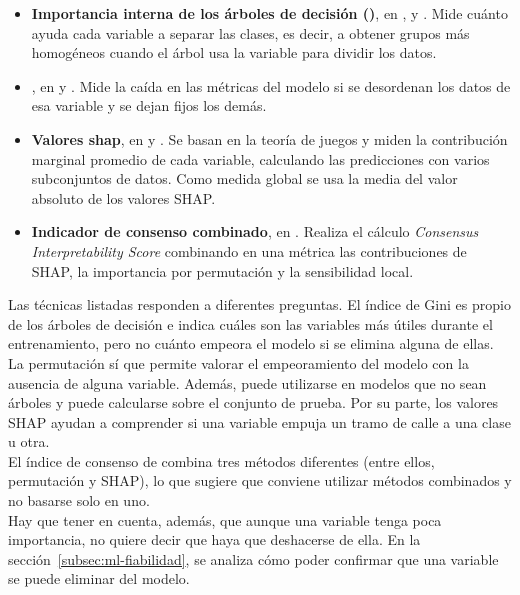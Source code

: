 \begin{itemize}
  \item \textbf{Importancia interna de los árboles de decisión ()}, en \textcite{smith2013}, \textcite{dong2019} y \textcite{li2024gsv}. Mide cuánto ayuda cada variable a separar las clases, es decir, a obtener grupos más homogéneos cuando el árbol usa la variable para dividir los datos.
  \item \textbf{}, en \textcite{agal2026} y \textcite{wu2026}. Mide la caída en las métricas del modelo si se desordenan los datos de esa variable y se dejan fijos los demás.
  \item \textbf{Valores \gls{shap}}, en \textcite{agal2026} y \textcite{wang2026}. Se basan en la teoría de juegos y miden la contribución marginal promedio de cada variable, calculando las predicciones con varios subconjuntos de datos. Como medida global se usa la media del valor absoluto de los valores SHAP.
  \item \textbf{Indicador de consenso combinado}, en \textcite{knights2026}. Realiza el cálculo \textit{Consensus Interpretability Score} combinando en una métrica las contribuciones de SHAP, la importancia por permutación y la sensibilidad local.
\end{itemize}

Las técnicas listadas responden a diferentes preguntas. El índice de Gini es propio de los árboles de decisión e indica cuáles son las variables más útiles durante el entrenamiento, pero no cuánto empeora el modelo si se elimina alguna de ellas.
\\

La permutación sí que permite valorar el empeoramiento del modelo con la ausencia de alguna variable. Además, puede utilizarse en modelos que no sean árboles y puede calcularse sobre el conjunto de prueba. Por su parte, los valores SHAP ayudan a comprender si una variable empuja un tramo de calle a una clase u otra.
\\

El índice de consenso de \textcite{knights2026} combina tres métodos diferentes (entre ellos, permutación y SHAP), lo que sugiere que conviene utilizar métodos combinados y no basarse solo en uno.
\\

Hay que tener en cuenta, además, que aunque una variable tenga poca importancia, no quiere decir que haya que deshacerse de ella. En la sección~\ref{subsec:ml-fiabilidad}, se analiza cómo poder confirmar que una variable se puede eliminar del modelo.
\\

